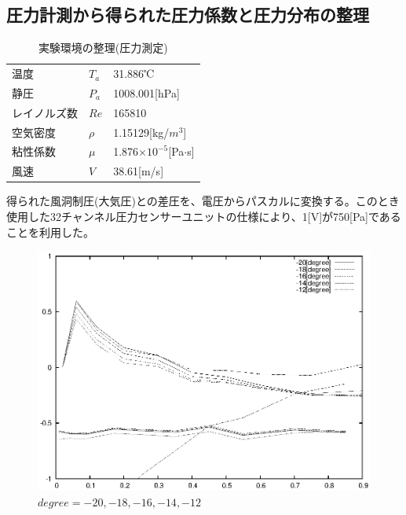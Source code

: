 \documentclass[a4j,twoside,openright,11pt]{jarticle}
\begin{document}
\subsection{圧力計測から得られた圧力係数と圧力分布の整理}
\begin{table}[htb]
\begin{center}
  \caption{実験環境の整理(圧力測定)}
  \begin{tabular}{lll} \hline
温度        &$T_a$  &31.886℃\\
静圧        &$P_a$  &1008.001[hPa]\\
レイノルズ数&$Re$   &165810\\
空気密度    &$\rho$ &1.15129[kg/$m^3$]\\
粘性係数    &$\mu$  &1.876$\times 10^{-5}$[Pa$\cdot$s]\\
風速        &$V$    &38.61[m/s]\\
\hline
  \end{tabular}
\end{center}
\end{table}
得られた風洞制圧(大気圧)との差圧を、電圧からパスカルに変換する。このとき使用した32チャンネル圧力センサーユニットの仕様により、1[V]が750[Pa]であることを利用した。
\begin{figure}[htbp]
\begin{center}
\includegraphics[width=12cm]{./2-CP/-20to-12.eps}
\end{center}
\caption{$degree = -20,-18,-16,-14,-12$}
\end{figure}
\end{document}
